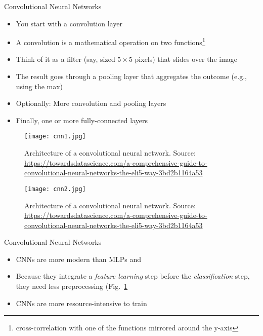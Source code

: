 \begin{frame}{Convolutional Neural Networks}
  \begin{itemize}[<+->]
  \item You start with a convolution layer
  \item A convolution is a mathematical operation on two functions\footnote{cross-correlation with one of the functions mirrored around the y-axis}
  \item Think of it as a filter (say, sized $5\times 5$ pixels) that slides over the image
  \item The result goes through a pooling layer that aggregates the outcome (e.g., using the max)
  \item Optionally: More convolution and pooling layers
  \item Finally, one or more fully-connected layers
  \end{itemize}
\end{frame}



\begin{frame}[plain]
\begin{figure}
  \centering
  \texttt{[image: cnn1.jpg]}
  \footnotesize{
 \caption{Architecture of a convolutional neural network. Source: \url{https://towardsdatascience.com/a-comprehensive-guide-to-convolutional-neural-networks-the-eli5-way-3bd2b1164a53} \label{fig:CNN1}}}
\end{figure}
\end{frame}


\begin{frame}[plain]
\begin{figure}
  \centering
  \texttt{[image: cnn2.jpg]}
  \footnotesize{
 \caption{Architecture of a convolutional neural network. Source: \url{https://towardsdatascience.com/a-comprehensive-guide-to-convolutional-neural-networks-the-eli5-way-3bd2b1164a53} \label{fig:CNN2}}}
\end{figure}
\end{frame}

  


\begin{frame}{Convolutional Neural Networks}
  \begin{itemize}[<+->]
  \item CNNs are more modern than MLPs and
  \item Because they integrate a \emph{feature learning} step before the \emph{classification} step, they need less preprocessing (Fig.~\ref{fig:CNN1}
  \item CNNs are more resource-intensive to train
  \end{itemize}
\end{frame}




